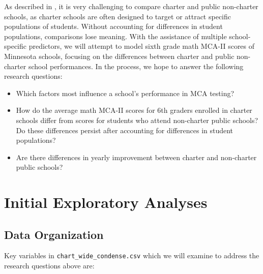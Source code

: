 \documentclass[
]{krantz}
\providecommand{\tightlist}{%
  \setlength{\itemsep}{0pt}\setlength{\parskip}{0pt}}
\begin{document}
As described in \citet{Green2003}, it is very challenging to compare charter and public non-charter schools, as charter schools are often designed to target or attract specific populations of students. Without accounting for differences in student populations, comparisons lose meaning. With the assistance of multiple school-specific predictors, we will attempt to model sixth grade math MCA-II scores of Minnesota schools, focusing on the differences between charter and public non-charter school performances. In the process, we hope to answer the following research questions:

\begin{itemize}
\tightlist
\item
  Which factors most influence a school's performance in MCA testing?
\item
  How do the average math MCA-II scores for 6th graders enrolled in charter schools differ from scores for students who attend non-charter public schools? Do these differences persist after accounting for differences in student populations?
\item
  Are there differences in yearly improvement between charter and non-charter public schools?
\end{itemize}

\hypertarget{exploratoryanalysis}{%
\section{Initial Exploratory Analyses}\label{exploratoryanalysis}}

\hypertarget{data}{%
\subsection{Data Organization}\label{data}}

Key variables in \texttt{chart\_wide\_condense.csv} which we will examine to address the research questions above are:
\end{document}

